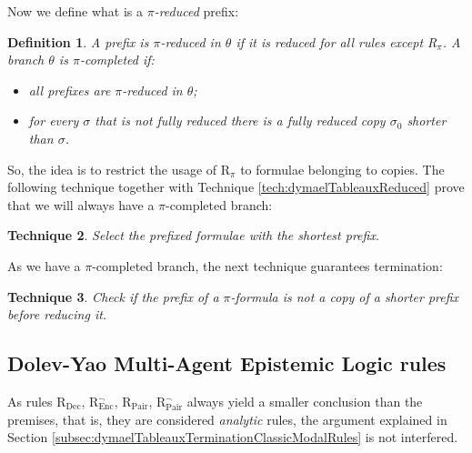 \documentclass[submission,copyright,creativecommons]{eptcs}
\newtheorem{definition}{Definition}[section]
\newtheorem{technique}[definition]{Technique}
\begin{document}
            Now we define what is a \emph{$\pi$-reduced} prefix:
            
            \begin{definition}
                A prefix is $\pi$-reduced in $\theta$ if it is reduced for all rules except R$_\pi$. A branch $\theta$ is $\pi$-completed if:
            
                \begin{itemize}
                    \item all prefixes are $\pi$-reduced in $\theta$;
                    
                    \item for every $\sigma$ that is not fully reduced there is a fully reduced copy $\sigma_0$ shorter than $\sigma$.
                \end{itemize}
            \end{definition}
            
            So, the idea is to restrict the usage of R$_\pi$ to formulae belonging to copies. The following technique together with Technique \ref{tech:dymaelTableauxReduced} prove that we will always have a $\pi$-completed branch:
            
            \begin{technique}
                Select the prefixed formulae with the shortest prefix.
            \end{technique}
            
            As we have a $\pi$-completed branch, the next technique guarantees termination:

            \begin{technique}
                Check if the prefix of a $\pi$-formula is not a copy of a shorter prefix before reducing it.
            \end{technique}

        \subsection{Dolev-Yao Multi-Agent Epistemic Logic rules}
            As rules R$_\text{Dec}$, R$_\text{Enc}^\neg$, R$_\text{Pair}$, R$_\text{Pair}^\neg$ always yield a smaller conclusion than the premises, that is, they are considered \emph{analytic} rules, the argument explained in Section \ref{subsec:dymaelTableauxTerminationClassicModalRules} is not interfered.



    \nocite{*}
    
    
\end{document}
